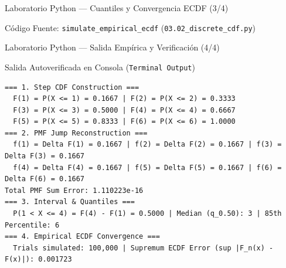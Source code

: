 \documentclass[10pt, aspectratio=169]{beamer}
\begin{document}
\begin{frame}[fragile]{Laboratorio Python — Cuantiles y Convergencia ECDF (3/4)}
  \begin{block}{Código Fuente: \texttt{simulate\_empirical\_ecdf} (\texttt{03.02\_discrete\_cdf.py})}
    \fontsize{6pt}{7pt}\selectfont
    
  \end{block}
\end{frame}

\begin{frame}[fragile]{Laboratorio Python — Salida Empírica y Verificación (4/4)}
  \begin{block}{Salida Autoverificada en Consola (\texttt{Terminal Output})}
    \fontsize{6.5pt}{7.5pt}\selectfont
\begin{verbatim}
=== 1. Step CDF Construction ===
  F(1) = P(X <= 1) = 0.1667 | F(2) = P(X <= 2) = 0.3333
  F(3) = P(X <= 3) = 0.5000 | F(4) = P(X <= 4) = 0.6667
  F(5) = P(X <= 5) = 0.8333 | F(6) = P(X <= 6) = 1.0000
=== 2. PMF Jump Reconstruction ===
  f(1) = Delta F(1) = 0.1667 | f(2) = Delta F(2) = 0.1667 | f(3) = Delta F(3) = 0.1667
  f(4) = Delta F(4) = 0.1667 | f(5) = Delta F(5) = 0.1667 | f(6) = Delta F(6) = 0.1667
Total PMF Sum Error: 1.110223e-16
=== 3. Interval & Quantiles ===
  P(1 < X <= 4) = F(4) - F(1) = 0.5000 | Median (q_0.50): 3 | 85th Percentile: 6
=== 4. Empirical ECDF Convergence ===
  Trials simulated: 100,000 | Supremum ECDF Error (sup |F_n(x) - F(x)|): 0.001723
\end{verbatim}
  \end{block}
\end{frame}
\end{document}
